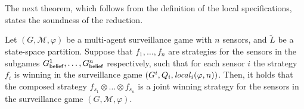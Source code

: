 The next theorem, which follows  from the definition of the local specifications, states the soundness of the reduction.

\begin{theorem}\label{thm:soundnes}
Let  $(G,\mathcal M,\varphi)$ be a multi-agent surveillance game with $n$ sensors, and $\widetilde{L}$ be a state-space partition. Suppose that $f_1,\ldots,f_n$ are strategies for the sensors in the subgames $G^1_{\mathsf{belief}},\ldots,G^n_{\mathsf{belief}}$ respectively, such that for each sensor $i$ the strategy $f_i$ is winning in the surveillance game $(G^i,Q_i,\mathit{local}_i(\varphi,n))$. Then, it holds that the composed strategy $f_{s_1}\otimes\ldots\otimes f_{s_n}$ is a joint winning strategy for the sensors in the surveillance game $(G,\mathcal M,\varphi)$.
\end{theorem}